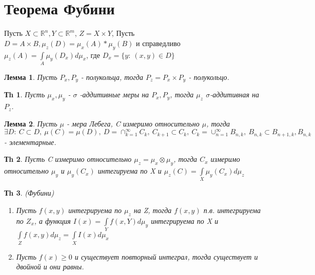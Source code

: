 \documentclass[14pt]{article}
\theoremstyle{plain}
\newtheorem{Thm}{Тh}
\newtheorem{Lem}{Лемма}
\theoremstyle{definition}
\begin{document}
	\section{Теорема Фубини}
		Пусть $X \subset \mathbb{R}^n, Y \subset \mathbb{R}^m$, $Z = X \times Y$, Пусть $D = A \times B, \mu_z(D) = \mu_x(A) * \mu_y(B)$ и справедливо $\mu_z(A) = \int\limits_A \mu_y(D_x) d\mu_x$, где $D_x = \{y: \ (x,y) \in D \}$
		\begin{Lem}
			Пусть $P_x, P_y$ - полукольца, тогда $P_z = P_x \times P_y$ - полукольцо.
		\end{Lem}
		\begin{Thm}
			Пусть $\mu_x, \mu_y$ - $\sigma$ -аддитивные меры на $P_x, P_y$, тогда $\mu_z$ $\sigma$-аддитивная на $P_z$.
		\end{Thm}
		\begin{Lem}
			Пусть $\mu$ - мера Лебега, C измеримо относительно $\mu$, тогда $\exists D: \ C \subset D, \ \mu(C) = \mu(D), \ D = \cap_{k=1}^{\infty} C_k, \ C_{k+1} \subset C_k, \ C_k = \cup_{n=1}^{\infty} B_{n,k}, \ B_{n, k} \subset B_{n+1,k}, B_{n,k}$ - элементарные. 
		\end{Lem}
		\begin{Thm}
			Пусть C измеримо относительно $\mu_z = \mu_x \otimes \mu_y$, тогда $C_x$ измеримо относительно $\mu_y$ и $\mu_y(C_x)$ интегируема по X и $\mu_z(C) = \int\limits_X \mu_y(C_x) d\mu_z$
		\end{Thm}
		\begin{Thm}
			(Фубини)\newline
			\begin{enumerate}
				\item Пусть $f(x,y)$ интегрируема по $\mu_z$ на Z, тогда  $f(x,y)$ п.в. интегрируема по $Z_x$, а функция $I(x) = \int\limits_Y f(x,Y) d\mu_y$ интегрируема по X и $\int\limits_Z f(x,y) d\mu_z = \int\limits_X I(x) d\mu_x$
				\item Пусть $f(x) \geq 0$ и существует повторный интеграл, тогда существует и двойной и они равны. 
			\end{enumerate}			
		\end{Thm}
\end{document}

